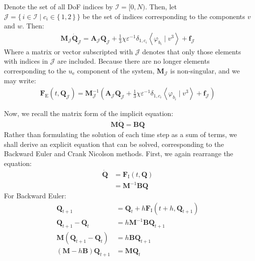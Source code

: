 \documentclass{article}
\newcommand{\bvec}[1]{\boldsymbol{#1}}
\newcommand{\bmat}[1]{\boldsymbol{#1}}
\begin{document}
Denote the set of all DoF indices by $\mathcal{I} = [0, N)$.
Then, let $\mathcal{J} = \{\, i \in \mathcal{I} \mid c_i \in \{\,1, 2\,\} \,\}$
be the set of indices corresponding to the components $v$ and $w$. Then:
\begin{align*}
    \bmat{M}_\mathcal{J} \dot{\bvec{Q}}_\mathcal{J}
        = \bmat{A}_\mathcal{J} \bvec{Q}_\mathcal{J}
            + \frac{1}{3} \chi \varepsilon^{-1} \delta_{1, c_i}
                \left< \varphi_{b_i} \mid v^3 \right>
            + \bvec{f}_\mathcal{J}
\end{align*}
\noindent Where a matrix or vector subscripted with $\mathcal{J}$
denotes that only those elements with indices in $\mathcal{J}$ are included.
Because there are no longer elements corresponding to the $u_\text{e}$ component
of the system, $\bmat{M}_\mathcal{J}$ is non-singular, and we may write:
\begin{align*}
    \bvec{F}_\text{E}(t, \bvec{Q}_\mathcal{J})
        = \bmat{M}_\mathcal{J}^{-1}
            (\bmat{A}_\mathcal{J} \bvec{Q}_\mathcal{J}
                + \frac{1}{3} \chi \varepsilon^{-1} \delta_{1, c_i}
                    \left< \varphi_{b_i} \mid v^3 \right>
                + \bvec{f}_\mathcal{J})
\end{align*}

Now, we recall the matrix form of the implicit equation:
\begin{align*}
    \bmat{M} \dot{\bvec{Q}} = \bmat{B} \bvec{Q}
\end{align*}
Rather than formulating the solution of each time step as a sum of terms,
we shall derive an explicit equation that can be solved,
corresponding to the Backward Euler and Crank Nicolson methods.
First, we again rearrange the equation:
\begin{align*}
    \dot{\bvec{Q}}
        & = \bvec{F}_\text{I}(t, \bvec{Q}) \\
        & = \bmat{M}^{-1} \bmat{B} \bvec{Q}
\end{align*}
\noindent For Backward Euler:
\begin{align*}
    \bvec{Q}_{t + 1} & = \bvec{Q}_t + h \bvec{F}_\text{I}(t + h, \bvec{Q}_{t + 1}) \\
    \bvec{Q}_{t + 1} - \bvec{Q}_t & = h \bmat{M}^{-1} \bmat{B} \bvec{Q}_{t + 1} \\
    \bmat{M} (\bvec{Q}_{t + 1} - \bvec{Q}_t) & = h \bmat{B} \bvec{Q}_{t + 1} \\
    (\bmat{M} - h \bmat{B}) \bvec{Q}_{t + 1} & = \bmat{M} \bvec{Q}_t
\end{align*}
\end{document}
